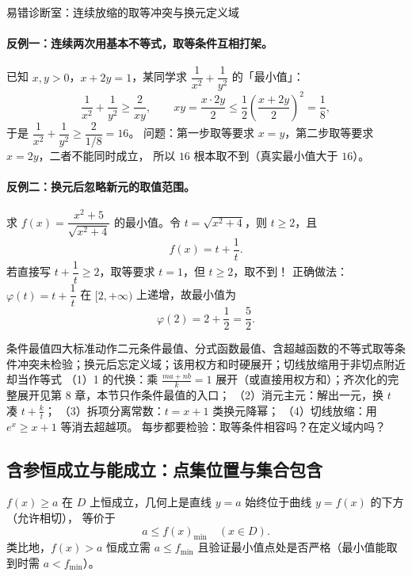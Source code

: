 \begin{explore}
\begin{commonerror}{易错诊断室：连续放缩的取等冲突与换元定义域}
\paragraph{反例一：连续两次用基本不等式，取等条件互相打架。}
已知 $x,y>0$，$x+2y=1$，某同学求 $\dfrac1{x^2}+\dfrac1{y^2}$ 的「最小值」：
\[
  \frac1{x^2}+\frac1{y^2}\ge\frac{2}{xy},\qquad
  xy=\frac{x\cdot2y}{2}\le\frac12\left(\frac{x+2y}{2}\right)^2=\frac18,
\]
于是 $\dfrac1{x^2}+\dfrac1{y^2}\ge\dfrac{2}{1/8}=16$。
问题：第一步取等要求 $x=y$，第二步取等要求 $x=2y$，二者不能同时成立，
所以 $16$ 根本取不到（真实最小值大于 $16$）。

\paragraph{反例二：换元后忽略新元的取值范围。}
求 $f(x)=\dfrac{x^2+5}{\sqrt{x^2+4}}$ 的最小值。令 $t=\sqrt{x^2+4}$，则 $t\ge2$，且
\[
  f(x)=t+\frac1t .
\]
若直接写 $t+\dfrac1t\ge2$，取等要求 $t=1$，但 $t\ge2$，取不到！
正确做法：$\varphi(t)=t+\dfrac1t$ 在 $[2,+\infty)$ 上递增，故最小值为
\[
  \varphi(2)=2+\frac12=\frac52 .
\]
\end{commonerror}

\begin{conccard}[一级]{条件最值四大标准动作}{二元条件最值、分式函数最值、含超越函数的不等式}{取等条件冲突未检验；换元后忘定义域；该用权方和时硬展开；切线放缩用于非切点附近却当作等式}
（1）1 的代换：乘 $\frac{ma+nb}k=1$ 展开（或直接用权方和）；齐次化的完整展开见第 8 章，本节只作条件最值的入口；
（2）消元主元：解出一元，换 $t$ 凑 $t+\frac kt$；
（3）拆项分离常数：$t=x+1$ 类换元降幂；
（4）切线放缩：用 $e^x\ge x+1$ 等消去超越项。
每步都要检验：取等条件相容吗？在定义域内吗？
\end{conccard}

\subsection{含参恒成立与能成立：点集位置与集合包含}


$f(x)\ge a$ 在 $D$ 上恒成立，几何上是直线 $y=a$ 始终位于曲线 $y=f(x)$ 的下方（允许相切），
等价于
\[
  a\le f(x)_{\min}\quad(x\in D).
\]
类比地，$f(x)>a$ 恒成立需 $a\le f_{\min}$ 且验证最小值点处是否严格（最小值能取到时需 $a<f_{\min}$）。


\end{explore}

